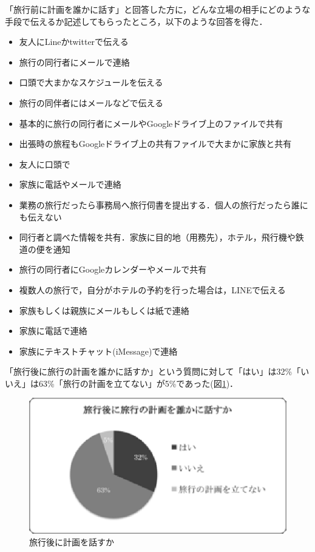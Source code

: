 \documentclass{funthesis}
\begin{document}
「旅行前に計画を誰かに話す」と回答した方に，どんな立場の相手にどのような手段で伝えるか記述してもらったところ，以下のような回答を得た．
\begin{itemize}
 \item 友人にLineかtwitterで伝える
 \item 旅行の同行者にメールで連絡
 \item 口頭で大まかなスケジュールを伝える
 \item 旅行の同伴者にはメールなどで伝える
 \item 基本的に旅行の同行者にメールやGoogleドライブ上のファイルで共有
 \item 出張時の旅程もGoogleドライブ上の共有ファイルで大まかに家族と共有
 \item 友人に口頭で
 \item 家族に電話やメールで連絡
 \item 業務の旅行だったら事務局へ旅行伺書を提出する．個人の旅行だったら誰にも伝えない
 \item 同行者と調べた情報を共有．家族に目的地（用務先），ホテル，飛行機や鉄道の便を通知
 \item 旅行の同行者にGoogleカレンダーやメールで共有
 \item 複数人の旅行で，自分がホテルの予約を行った場合は，LINEで伝える
 \item 家族もしくは親族にメールもしくは紙で連絡
 \item 家族に電話で連絡
 \item 家族にテキストチャット(iMessage)で連絡
\end{itemize}


「旅行後に旅行の計画を誰かに話すか」という質問に対して「はい」は32\%「いいえ」は63\%「旅行の計画を立てない」が5\%であった(図\ref{Laftertalktrip})．

\begin{figure}[htpb]
\begin{center}
\includegraphics[scale=0.65]{aftertalktrip.eps}
\end{center}
\caption{旅行後に計画を話すか}
\label{Laftertalktrip}
\end{figure}
\end{document}

